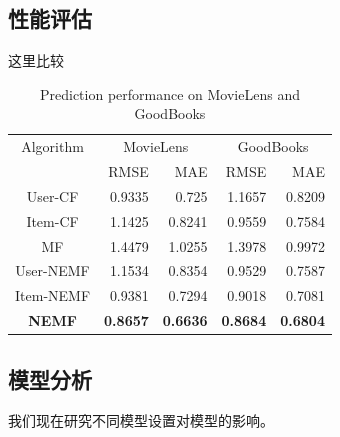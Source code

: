 \documentclass[lang=cn,11pt]{elegantpaper}
\begin{document}
\subsection{性能评估}

这里比较

\begin{table}[tbp]
	\centering
	\caption{Prediction performance on MovieLens and GoodBooks \label{tab:result}}
	\setlength{\tabcolsep}{7mm}
	
	\begin{tabular}{ccrrrr}
		\toprule
		\multicolumn{ 2}{c}{Algorithm} & \multicolumn{ 2}{c}{MovieLens} & \multicolumn{ 2}{c}{GoodBooks} \\
		
		\multicolumn{ 2}{c}{} &       RMSE &        MAE &       RMSE &        MAE \\
		\midrule
		
		\multicolumn{ 2}{c}{User-CF} &     0.9335 &      0.725 &     1.1657 &     0.8209 \\
		
		\multicolumn{ 2}{c}{Item-CF} &     1.1425 &     0.8241 &     0.9559 &     0.7584 \\
		
		\multicolumn{ 2}{c}{MF} &     1.4479 &     1.0255 &     1.3978 &     0.9972 \\
		
		\multicolumn{ 2}{c}{User-NEMF} &     1.1534 &     0.8354 &     0.9529 &     0.7587 \\
		
		\multicolumn{ 2}{c}{Item-NEMF} &     0.9381 &     0.7294 &     0.9018 &     0.7081 \\
		
		\multicolumn{ 2}{c}{\textbf{NEMF}} &     \textbf{0.8657} &     \textbf{0.6636} &     \textbf{0.8684} &     \textbf{0.6804} \\
		\bottomrule
	\end{tabular} 	
\end{table}

\subsection{模型分析}

我们现在研究不同模型设置对模型的影响。
\end{document}
